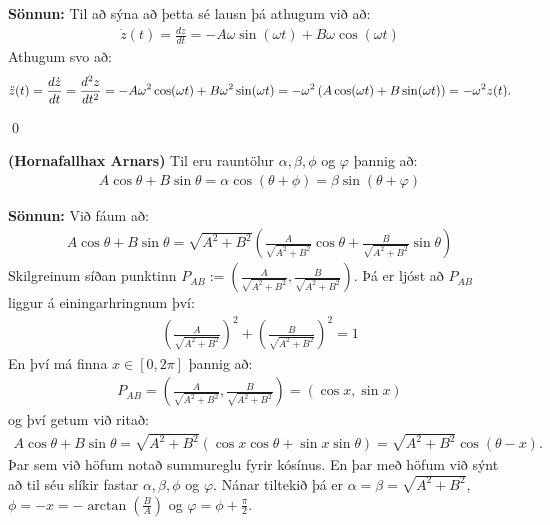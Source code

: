 \ifdefined \wholebook \else\documentclass[oneside]{book}\usepackage{EdlBook}\graphicspath{{figures/}}
\begin{document}
\textbf{Sönnun:} Til að sýna að þetta sé lausn þá athugum við að:
\begin{align*}
    \dot{z}(t) = \frac{dz}{dt} = -A\omega \sin(\omega t) + B\omega \cos(\omega t)
\end{align*}
Athugum svo að:
\begin{align*}
    \Ddot{z}(t) = \frac{d\dot{z}}{dt} =  \frac{d^2z}{dt^2} = -A\omega^2 \cos(\omega t) + B\omega^2 \sin(\omega t) = -\omega^2 \left( A\cos(\omega t) + B\sin(\omega t) \right) = -\omega^2 z(t).
\end{align*}

\qed

\begin{tcolorbox}
\begin{setning} \label{regla:hornafallahaxArnars}
\textbf{(Hornafallhax Arnars)} Til eru rauntölur $\alpha, \beta, \phi$ og $\varphi$ þannig að:
\begin{align*}
    A\cos\theta + B\sin\theta = \alpha\cos(\theta + \phi) = \beta \sin(\theta + \varphi)
\end{align*}
\end{setning}
\end{tcolorbox}

\textbf{Sönnun:} Við fáum að:
\begin{align*}
    A\cos\theta + B\sin\theta = \sqrt{A^2 + B^2}\left( \frac{A}{\sqrt{A^2+B^2}}\cos\theta + \frac{B}{\sqrt{A^2 +B^2}}\sin\theta \right)
\end{align*}
Skilgreinum síðan punktinn $P_{AB} := \left( \frac{A}{\sqrt{A^2+B^2}}, \frac{B}{\sqrt{A^2+B^2}} \right)$. Þá er ljóst að $P_{AB}$ liggur á einingarhringnum því:
\begin{align*}
    \left(\frac{A}{\sqrt{A^2+B^2}}\right)^2 + \left( \frac{B}{\sqrt{A^2+B^2}} \right)^2 = 1
\end{align*}
En því má finna $x \in [0,2\pi]$ þannig að:
\begin{align*}
    P_{AB} = \left( \frac{A}{\sqrt{A^2+B^2}}, \frac{B}{\sqrt{A^2+B^2}} \right) = \left( \cos x, \sin x \right)
\end{align*}
og því getum við ritað:
\begin{align*}
    A\cos\theta + B\sin\theta = \sqrt{A^2+B^2}\left( \cos x \cos\theta + \sin x \sin\theta \right) = \sqrt{A^2+B^2} \cos(\theta - x).
\end{align*}
Þar sem við höfum notað summureglu fyrir kósínus. En þar með höfum við sýnt að til séu slíkir fastar $\alpha, \beta, \phi$ og $\varphi$. Nánar tiltekið þá er $\alpha = \beta = \sqrt{A^2+B^2}$, $\phi = -x = -\arctan(\frac{B}{A})$ og $\varphi = \phi + \frac{\pi}{2}$.
\end{document}
